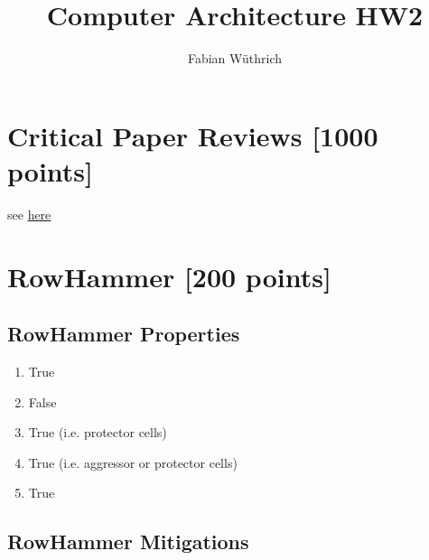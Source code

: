 \documentclass[a4paper]{article}
\title{Computer Architecture HW2}
\author{Fabian Wüthrich}
\begin{document}
\maketitle

\section{Critical Paper Reviews [1000 points]}

see \href{https://safari.ethz.ch/review/architecture20/}{here}

\section{RowHammer [200 points]}

\subsection{RowHammer Properties}

\begin{enumerate}[label=\alph*)]
    \item True
    \item False
    \item True (i.e. protector cells)
    \item True (i.e. aggressor or protector cells)
    \item True
\end{enumerate}

\subsection{RowHammer Mitigations}
\end{document}
